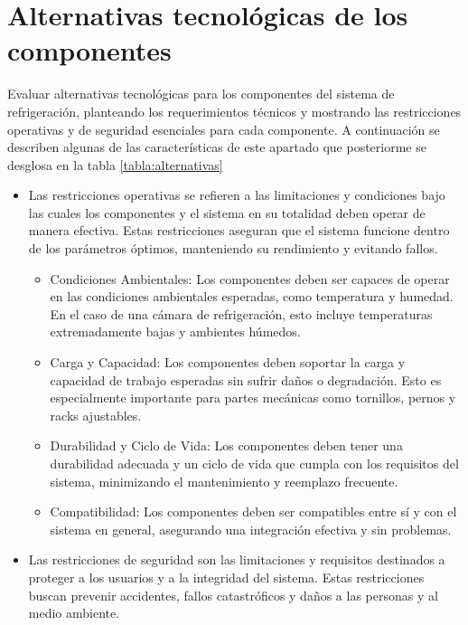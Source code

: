 \section{Alternativas tecnológicas de los componentes}
Evaluar alternativas tecnológicas para los componentes del sistema de refrigeración, planteando los requerimientos técnicos y mostrando las restricciones operativas y de seguridad esenciales para cada componente. A continuación se describen algunas de las características de este apartado que posteriorme se desglosa en la tabla \ref{tabla:alternativas}
\begin{itemize}
	\item Las restricciones operativas se refieren a las limitaciones y condiciones bajo las cuales los componentes y el sistema en su totalidad deben operar de manera efectiva. Estas restricciones aseguran que el sistema funcione dentro de los parámetros óptimos, manteniendo su rendimiento y evitando fallos.
	
	\begin{itemize}
		\item {Condiciones Ambientales:} Los componentes deben ser capaces de operar en las condiciones ambientales esperadas, como temperatura y humedad. En el caso de una cámara de refrigeración, esto incluye temperaturas extremadamente bajas y ambientes húmedos.
		\item {Carga y Capacidad:} Los componentes deben soportar la carga y capacidad de trabajo esperadas sin sufrir daños o degradación. Esto es especialmente importante para partes mecánicas como tornillos, pernos y racks ajustables.
		\item {Durabilidad y Ciclo de Vida:} Los componentes deben tener una durabilidad adecuada y un ciclo de vida que cumpla con los requisitos del sistema, minimizando el mantenimiento y reemplazo frecuente.
		\item {Compatibilidad:} Los componentes deben ser compatibles entre sí y con el sistema en general, asegurando una integración efectiva y sin problemas.
	\end{itemize}
	
	
	
	\item Las restricciones de seguridad son las limitaciones y requisitos destinados a proteger a los usuarios y a la integridad del sistema. Estas restricciones buscan prevenir accidentes, fallos catastróficos y daños a las personas y al medio ambiente.
	

\end{itemize}
